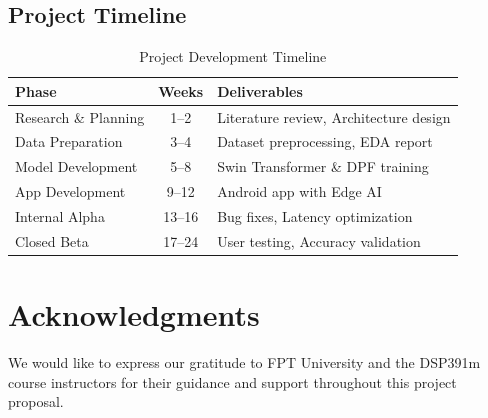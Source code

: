 \documentclass[fleqn,10pt]{SelfArx} %
\begin{document}
\subsection{Project Timeline}

\begin{table}[!htb]
\centering
\caption{Project Development Timeline}
\label{tab:timeline}
\small
\begin{tabular}{|p{2.5cm}|c|p{3.5cm}|}
\hline
\textbf{Phase} & \textbf{Weeks} & \textbf{Deliverables} \\
\hline
Research \& Planning & 1--2 & Literature review, Architecture design \\
\hline
Data Preparation & 3--4 & Dataset preprocessing, EDA report \\
\hline
Model Development & 5--8 & Swin Transformer \& DPF training \\
\hline
App Development & 9--12 & Android app with Edge AI \\
\hline
Internal Alpha & 13--16 & Bug fixes, Latency optimization \\
\hline
Closed Beta & 17--24 & User testing, Accuracy validation \\
\hline
\end{tabular}
\end{table}


\section*{Acknowledgments} %


We would like to express our gratitude to FPT University and the DSP391m course instructors for their guidance and support throughout this project proposal.


\printbibliography[heading=bibintoc]

\end{document}
